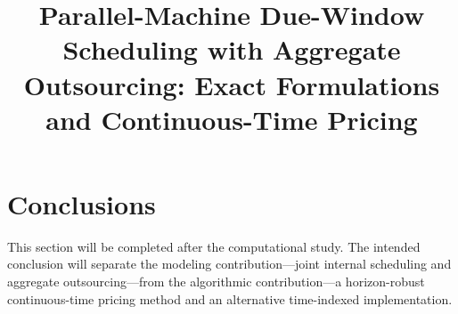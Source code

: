 \documentclass[11pt]{article}
\title{Parallel-Machine Due-Window Scheduling with Aggregate Outsourcing:
Exact Formulations and Continuous-Time Pricing}
\author{}
\date{}
\begin{document}
\maketitle









\section{Conclusions}\label{sec:conclusions}

This section will be completed after the computational study. The intended conclusion
will separate the modeling contribution---joint internal scheduling and aggregate
outsourcing---from the algorithmic contribution---a horizon-robust continuous-time
pricing method and an alternative time-indexed implementation.



\end{document}
